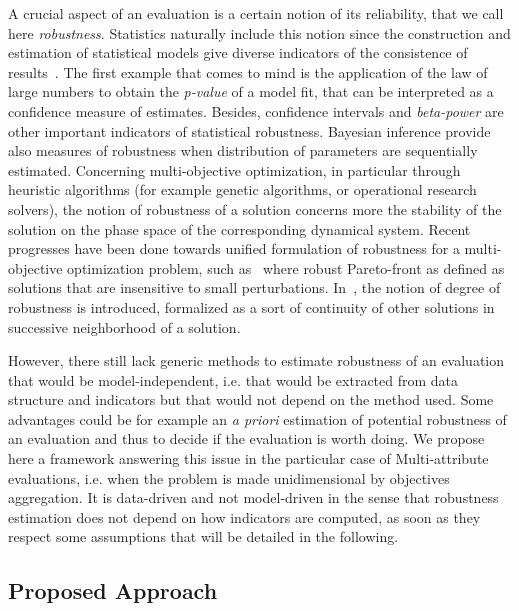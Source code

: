 \documentclass[runningheads,a4paper]{llncs2e/llncs}
\begin{document}
A crucial aspect of an evaluation is a certain notion of its reliability, that we call here \emph{robustness}.%
Statistics naturally include this notion since the construction and estimation of statistical models give diverse indicators of the consistence of results~\cite{launer2014robustness}. The first example that comes to mind is the application of the law of large numbers to obtain the \emph{p-value} of a model fit, that can be interpreted as a confidence measure of estimates. Besides, confidence intervals and \emph{beta-power} are other important indicators of statistical robustness. Bayesian inference provide also measures of robustness when distribution of parameters are sequentially estimated. Concerning multi-objective optimization, in particular through heuristic algorithms (for example genetic algorithms, or operational research solvers), the notion of robustness of a solution concerns more the stability of the solution on the phase space of the corresponding dynamical system. Recent progresses have been done towards unified formulation of robustness for a multi-objective optimization problem, such as~\cite{deb2006introducing} where robust Pareto-front as defined as solutions that are insensitive to small perturbations. In~\cite{1688537}, the notion of degree of robustness is introduced, formalized as a sort of continuity of other solutions in successive neighborhood of a solution.

However, there still lack generic methods to estimate robustness of an evaluation that would be model-independent, i.e. that would be extracted from data structure and indicators but that would not depend on the method used. Some advantages could be for example an \emph{a priori} estimation of potential robustness of an evaluation and thus to decide if the evaluation is worth doing. We propose here a framework answering this issue in the particular case of Multi-attribute evaluations, i.e. when the problem is made unidimensional by objectives aggregation. It is data-driven and not model-driven in the sense that robustness estimation does not depend on how indicators are computed, as soon as they respect some assumptions that will be detailed in the following.


\subsection{Proposed Approach}
\end{document}
